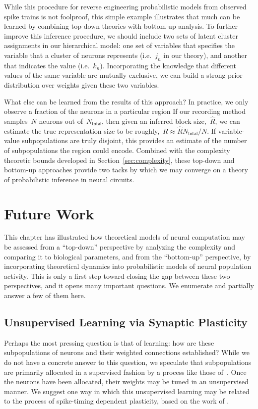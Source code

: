 While this procedure for reverse engineering probabilistic models
from observed spike trains is not foolproof, this simple example
illustrates that much can be learned by combining top-down theories
with bottom-up analysis. To further improve this inference procedure,
we should include two sets of latent cluster assignments in our
hierarchical model: one set of variables that specifies the
variable that a cluster of neurons represents (i.e.~$j_n$ in our
theory), and another that indicates the value (i.e.~$k_n$).
Incorporating the knowledge that different values of the same variable
are mutually exclusive, we can build a strong prior distribution
over weights given these two variables. 

What else can be learned from the results of this approach? In
practice, we only observe a fraction of the neurons in a particular
region If our recording method samples~$N$ neurons out
of~$N_{\mathsf{total}}$, then given an inferred block
size,~$\widehat{R}$, we can estimate the true representation size to
be roughly,~$R\approx \widehat{R} N_{\mathsf{total}} / N$. If variable-value
subpopulations are truly disjoint, this provides an estimate of the
number of subpopulations the region could encode. Combined with the
complexity theoretic bounds developed in Section~\ref{sec:complexity},
these top-down and bottom-up approaches provide two tacks  by which we may 
converge on a theory of probabilistic inference in neural circuits.

\section{Future Work}
\label{sec:future}

This chapter has illustrated how theoretical models of neural computation
may be assessed from a ``top-down'' perspective by analyzing the complexity
and comparing it to biological parameters, and from the ``bottom-up'' perspective,
by incorporating theoretical dynamics into probabilistic models of neural
population activity. This is only a first step toward closing the gap
between these two perspectives, and it opens many important questions.
We enumerate and partially answer a few of them here.

\subsection{Unsupervised Learning via Synaptic Plasticity}
\label{sec:learning}
Perhaps the most pressing question is that of learning: how are these
subpopulations of neurons and their weighted connections established?
While we do not have a concrete answer to this question, we
speculate that subpopulations are primarily allocated in a supervised
fashion by a process like those of~\citet{valiant1994circuits}.
Once the neurons have been allocated, their weights may be tuned
in an unsupervised manner. We suggest one way in which this unsupervised
learning may be related to the process of spike-timing dependent
plasticity, based on the work of \citet{nessler2013bayesian}.


